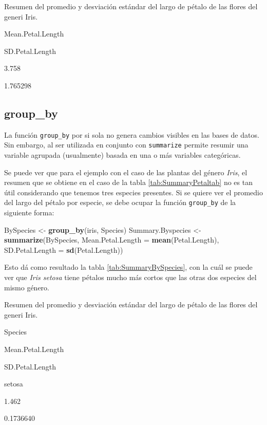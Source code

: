 \documentclass[]{book}
\newenvironment{Shaded}{\begin{snugshade}}{\end{snugshade}}
\newcommand{\DataTypeTok}[1]{\textcolor[rgb]{0.13,0.29,0.53}{#1}}
\newcommand{\KeywordTok}[1]{\textcolor[rgb]{0.13,0.29,0.53}{\textbf{#1}}}
\newcommand{\NormalTok}[1]{#1}
\newcommand{\StringTok}[1]{\textcolor[rgb]{0.31,0.60,0.02}{#1}}
\begin{document}
\label{tab:SummaryPetaltab}Resumen del promedio y desviación estándar del
largo de pétalo de las flores del generi Iris.

Mean.Petal.Length

SD.Petal.Length

3.758

1.765298

\hypertarget{group_by}{%
\subsection{group\_by}\label{group_by}}

La función \texttt{group\_by} por si sola no genera cambios visibles en
las bases de datos. Sin embargo, al ser utilizada en conjunto con
\texttt{summarize} permite resumir una variable agrupada (usualmente)
basada en una o más variables categóricas.

Se puede ver que para el ejemplo con el caso de las plantas del género
\emph{Iris}, el resumen que se obtiene en el caso de la tabla
\ref{tab:SummaryPetaltab} no es tan útil considerando que tenemos tres
especies presentes. Si se quiere ver el promedio del largo del pétalo
por especie, se debe ocupar la función \texttt{group\_by} de la
siguiente forma:

\begin{Shaded}
\begin{Highlighting}[]
\NormalTok{BySpecies <-}\StringTok{ }\KeywordTok{group_by}\NormalTok{(iris, Species)}
\NormalTok{Summary.Byspecies <-}\StringTok{ }\KeywordTok{summarize}\NormalTok{(BySpecies, }\DataTypeTok{Mean.Petal.Length =} \KeywordTok{mean}\NormalTok{(Petal.Length), }
    \DataTypeTok{SD.Petal.Length =} \KeywordTok{sd}\NormalTok{(Petal.Length))}
\end{Highlighting}
\end{Shaded}

Esto dá como resultado la tabla \ref{tab:SummaryBySpecies}, con la cuál
se puede ver que \emph{Iris setosa} tiene pétalos mucho más cortos que
las otras dos especies del mismo género.

\label{tab:SummaryBySpecies}Resumen del promedio y desviación estándar del
largo de pétalo de las flores del generi Iris.

Species

Mean.Petal.Length

SD.Petal.Length

setosa

1.462

0.1736640
\end{document}
